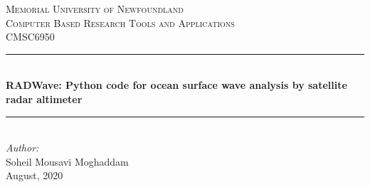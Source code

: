\documentclass[12pt]{article}
\begin{document}
\begin{titlepage}

\newcommand{\HRule}{\rule{\linewidth}{0.5mm}} %

\center %
 

\textsc{ Memorial University of Newfoundland}\\[1.5cm] %

\textsc{\Large Computer Based Research Tools and Applications}\\[0.5cm] %
\textsc{\large CMSC6950}\\[0.5cm] %


\HRule \\[0.4cm]
{ \huge \bfseries RADWave: Python code for ocean surface wave analysis by satellite radar altimeter}\\[0.4cm] %
\HRule \\[1.5cm]
 

\Large \emph{Author:}\\
Soheil Mousavi Moghaddam\\[3cm] %


{\large August, 2020}\\[2cm] %

\vfill %

\end{titlepage}
\end{document}
